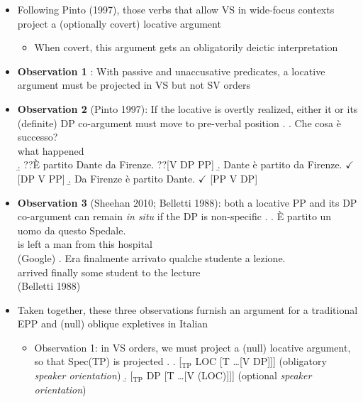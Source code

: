 \documentclass[letterpaper,10pt]{handout_nick}
\begin{document}
\begin{itemize}
\item Following Pinto (1997), those verbs that allow VS in wide-focus contexts project a (optionally covert) locative argument 
\begin{itemize}
\item When covert, this argument gets an obligatorily deictic interpretation 
\end{itemize}
\item {\bf Observation 1} \citep{pinto97}: With passive and unaccusative predicates, a locative argument must be projected in VS but not SV orders
\item {\bf Observation 2} (Pinto 1997): If the locative is overtly realized, either it or its (definite) DP co-argument must move to pre-verbal position
\ex. \ag. Che cosa \`e successo?\\
what happened\\
\b. ??\`E partito Dante da Firenze. \hfill ??[V DP PP]
\b. Dante \`e partito da Firenze. \hfill $\checkmark$ [DP V PP]
\b. Da Firenze \`e partito Dante. \hfill $\checkmark$ [PP V DP]


\item {\bf Observation 3} (Sheehan 2010; Belletti 1988): both a locative PP and its DP co-argument can remain \emph{in situ} if the DP is non-specific
\ex. \ag. \`E partito un uomo da questo Spedale.\\
is left a man from this hospital\\
(Google)
\bg. Era finalmente arrivato qualche studente a lezione.\\
arrived finally some student to the lecture\\
(Belletti 1988)

\item Taken together, these three observations furnish an argument for a traditional EPP and (null) oblique expletives in Italian 
\begin{itemize}
\item Observation 1: in VS orders, we must project a (null) locative argument, so that Spec(TP) is projected
\ex. \a. [$_\text{TP}$ LOC [T \ldots [V DP]]] \hfill (obligatory \emph{speaker orientation})
\b. [$_\text{TP}$ DP [T \ldots [V (LOC)]]] \hfill (optional \emph{speaker orientation}) 


\end{itemize}
\end{itemize}
\end{document}
